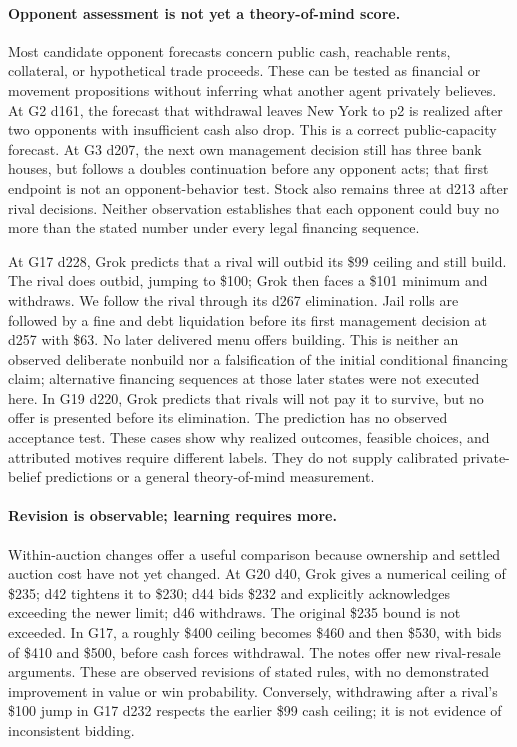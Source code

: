 \paragraph{Opponent assessment is not yet a theory-of-mind score.}
Most candidate opponent forecasts concern public cash, reachable rents, collateral, or hypothetical trade proceeds. These can be tested as financial or movement propositions without inferring what another agent privately believes. At G2 d161, the forecast that withdrawal leaves New York to p2 is realized after two opponents with insufficient cash also drop. This is a correct public-capacity forecast. At G3 d207, the next own management decision still has three bank houses, but follows a doubles continuation before any opponent acts; that first endpoint is not an opponent-behavior test. Stock also remains three at d213 after rival decisions. Neither observation establishes that each opponent could buy no more than the stated number under every legal financing sequence.

At G17 d228, Grok predicts that a rival will outbid its \$99 ceiling and still build. The rival does outbid, jumping to \$100; Grok then faces a \$101 minimum and withdraws. We follow the rival through its d267 elimination. Jail rolls are followed by a fine and debt liquidation before its first management decision at d257 with \$63. No later delivered menu offers building. This is neither an observed deliberate nonbuild nor a falsification of the initial conditional financing claim; alternative financing sequences at those later states were not executed here. In G19 d220, Grok predicts that rivals will not pay it to survive, but no offer is presented before its elimination. The prediction has no observed acceptance test. These cases show why realized outcomes, feasible choices, and attributed motives require different labels. They do not supply calibrated private-belief predictions or a general theory-of-mind measurement.

\paragraph{Revision is observable; learning requires more.}
Within-auction changes offer a useful comparison because ownership and settled auction cost have not yet changed. At G20 d40, Grok gives a numerical ceiling of \$235; d42 tightens it to \$230; d44 bids \$232 and explicitly acknowledges exceeding the newer limit; d46 withdraws. The original \$235 bound is not exceeded. In G17, a roughly \$400 ceiling becomes \$460 and then \$530, with bids of \$410 and \$500, before cash forces withdrawal. The notes offer new rival-resale arguments. These are observed revisions of stated rules, with no demonstrated improvement in value or win probability. Conversely, withdrawing after a rival's \$100 jump in G17 d232 respects the earlier \$99 cash ceiling; it is not evidence of inconsistent bidding.

